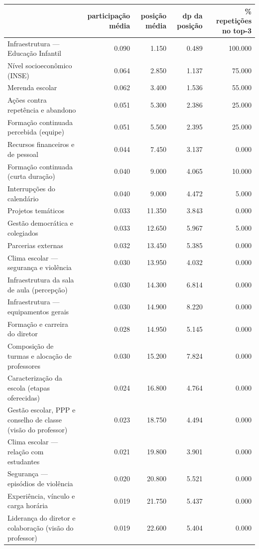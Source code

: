 \begin{tabular}{lrrrr}
\toprule
 & participação média & posição média & dp da posição & \% repetições no top-3 \\
\midrule
Infraestrutura — Educação Infantil & 0.090 & 1.150 & 0.489 & 100.000 \\
Nível socioeconômico (INSE) & 0.064 & 2.850 & 1.137 & 75.000 \\
Merenda escolar & 0.062 & 3.400 & 1.536 & 55.000 \\
Ações contra repetência e abandono & 0.051 & 5.300 & 2.386 & 25.000 \\
Formação continuada percebida (equipe) & 0.051 & 5.500 & 2.395 & 25.000 \\
Recursos financeiros e de pessoal & 0.044 & 7.450 & 3.137 & 0.000 \\
Formação continuada (curta duração) & 0.040 & 9.000 & 4.065 & 10.000 \\
Interrupções do calendário & 0.040 & 9.000 & 4.472 & 5.000 \\
Projetos temáticos & 0.033 & 11.350 & 3.843 & 0.000 \\
Gestão democrática e colegiados & 0.033 & 12.650 & 5.967 & 5.000 \\
Parcerias externas & 0.032 & 13.450 & 5.385 & 0.000 \\
Clima escolar — segurança e violência & 0.030 & 13.950 & 4.032 & 0.000 \\
Infraestrutura da sala de aula (percepção) & 0.030 & 14.300 & 6.814 & 0.000 \\
Infraestrutura — equipamentos gerais & 0.030 & 14.900 & 8.220 & 0.000 \\
Formação e carreira do diretor & 0.028 & 14.950 & 5.145 & 0.000 \\
Composição de turmas e alocação de professores & 0.030 & 15.200 & 7.824 & 0.000 \\
Caracterização da escola (etapas oferecidas) & 0.024 & 16.800 & 4.764 & 0.000 \\
Gestão escolar, PPP e conselho de classe (visão do professor) & 0.023 & 18.750 & 4.494 & 0.000 \\
Clima escolar — relação com estudantes & 0.021 & 19.800 & 3.901 & 0.000 \\
Segurança — episódios de violência & 0.020 & 20.800 & 5.521 & 0.000 \\
Experiência, vínculo e carga horária & 0.019 & 21.750 & 5.437 & 0.000 \\
Liderança do diretor e colaboração (visão do professor) & 0.019 & 22.600 & 5.404 & 0.000 \\

\end{tabular}
